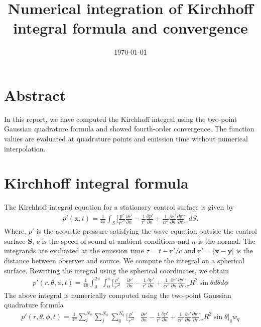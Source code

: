 \documentclass[a4paper]{article}
\title{Numerical integration of Kirchhoff integral formula and convergence}
\author{}
\date{\today}
\begin{document}
\maketitle

\section*{Abstract}
In this report, we have computed the Kirchhoff integral using the two-point Gaussian quadrature formula and showed fourth-order convergence. The function values are evaluated at quadrature points and emission time without numerical interpolation.

\section*{Kirchhoff integral formula}
The Kirchhoff integral equation for a stationary control surface is given by
\begin{equation}
    \begin{split}
        p'(\mathbf{x}, t) = \frac{1}{4\pi}\int_{S}\Big[  \frac{p'}{r'^{2}}\frac{\partial r'}{\partial n} - \frac{1}{r'}\frac{\partial p'}{\partial n} + \frac{1}{c r'}\frac{\partial r'}{\partial n}\frac{\partial p'}{\partial \tau} \Big]_{\tau} dS.
    \end{split}
\end{equation}
Where, $p'$ is the acoustic pressure satisfying the wave equation outside the control surface \textbf{S}, $c$ is the speed of sound at ambient conditions and $n$ is the normal.
The integrands are evaluated at the emission time $\tau = t - \mathbf{r'}/c$ and $\mathbf{r'}= |\mathbf{x} - \mathbf{y}|$ is the distance between observer and source. 
We compute the integral on a spherical surface. Rewriting the integral using the spherical coordinates, we obtain 
\begin{equation}
    \begin{split}
        p'(r, \theta, \phi,t) =  \frac{1}{4\pi}\int_{0}^{2\pi}\int_{0}^{\pi}\Big[  \frac{p'}{r'^{2}}&\frac{\partial r'}{\partial n} - \frac{1}{r'}\frac{\partial p'}{\partial n} + \frac{1}{c r'}\frac{\partial r'}{\partial n}\frac{\partial p'}{\partial \tau} \Big]_{\tau} R^2\sin\theta d\theta d \phi  
    \end{split} 
\end{equation}
The above integral is numerically computed using the two-point Gaussian quadrature formula
\begin{equation}
    \begin{split}
        p'(r, \theta, \phi,t) =  \frac{1}{4\pi} \sum_{i}^{N_{\theta}}\sum_{j}^{N_{\phi}} \sum_q^{N_q} \Big[  \frac{p'}{r'^{2}}&\frac{\partial r'}{\partial n} - \frac{1}{r'}\frac{\partial p'}{\partial n} + \frac{1}{c r'}\frac{\partial r'}{\partial n}\frac{\partial p'}{\partial \tau} \Big]_{\tau} R^2\sin\theta \Big|_{q} w_q  
    \end{split} 
\end{equation}
\end{document}
